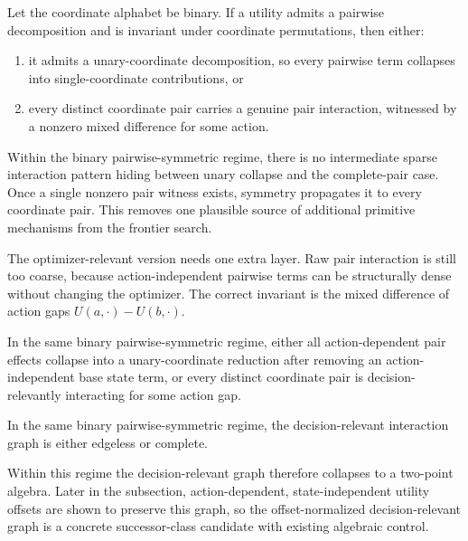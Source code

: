 \begin{proposition}\label{prop:binary-pairwise-dichotomy}
Let the coordinate alphabet be binary. If a utility admits a pairwise decomposition and is invariant under coordinate permutations, then either:
\begin{enumerate}
\item it admits a unary-coordinate decomposition, so every pairwise term collapses into single-coordinate contributions, or
\item every distinct coordinate pair carries a genuine pair interaction, witnessed by a nonzero mixed difference for some action.
\end{enumerate}
\end{proposition}

Within the binary pairwise-symmetric regime, there is no intermediate sparse interaction pattern hiding between unary collapse and the complete-pair case. Once a single nonzero pair witness exists, symmetry propagates it to every coordinate pair. This removes one plausible source of additional primitive mechanisms from the frontier search.

The optimizer-relevant version needs one extra layer. Raw pair interaction is still too coarse, because action-independent pairwise terms can be structurally dense without changing the optimizer. The correct invariant is the mixed difference of action gaps $U(a,
\cdot)-U(b,\cdot)$.

\begin{proposition}\label{prop:decision-relevant-binary-pairwise-dichotomy}
In the same binary pairwise-symmetric regime, either all action-dependent pair effects collapse into a unary-coordinate reduction after removing an action-independent base state term, or every distinct coordinate pair is decision-relevantly interacting for some action gap.
\end{proposition}

\begin{proposition}\label{prop:symmetric-binary-pairwise-graph-dichotomy}
In the same binary pairwise-symmetric regime, the decision-relevant interaction graph is either edgeless or complete.
\end{proposition}

Within this regime the decision-relevant graph therefore collapses to a two-point algebra. Later in the subsection, action-dependent, state-independent utility offsets are shown to preserve this graph, so the offset-normalized decision-relevant graph is a concrete successor-class candidate with existing algebraic control.

